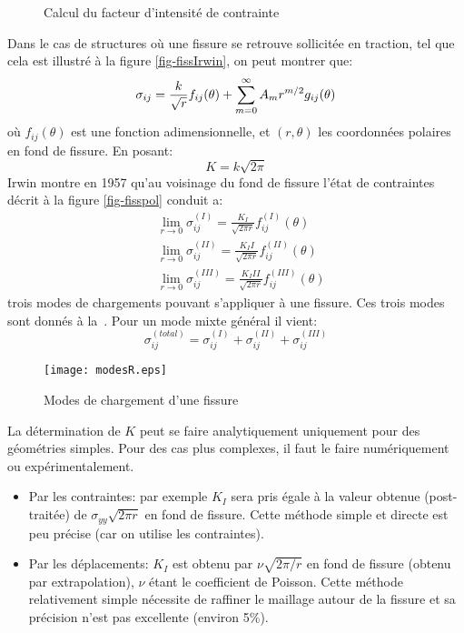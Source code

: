 \begin{figure}[ht]\centering
{}\hspace{6em}
\caption{Calcul du facteur d'intensité de contrainte}
\end{figure}
Dans le cas de structures où une fissure se retrouve sollicitée en traction, tel que cela est illustré à la figure \ref{fig-fissIrwin},
on peut montrer que:
\begin{equation} \sigma_{ij} = \frac{k}{\sqrt{r}} f_{ij}(\theta) + \displaystyle\sum_{m=0}^\infty A_m r^{m/2} g_{ij}(\theta) \end{equation}
où $f_{ij}(\theta)$ est une fonction adimensionnelle, et $(r, \theta)$ les coordonnées polaires en fond
de fissure.
En posant:
\begin{equation} K = k\sqrt{2\pi} \end{equation}
Irwin montre en 1957 qu'au voisinage du fond de
fissure l'état de contraintes décrit à la figure \ref{fig-fisspol} conduit a:
\begin{align}
&\lim_{r\rightarrow0} \sigma_{ij}^{(I)} = \frac{K_I}{\sqrt{2\pi r}} f_{ij}^{(I)}(\theta) \\
&\lim_{r\rightarrow0} \sigma_{ij}^{(II)} = \frac{K_II}{\sqrt{2\pi r}} f_{ij}^{(II)}(\theta) \\
&\lim_{r\rightarrow0} \sigma_{ij}^{(III)} = \frac{K_III}{\sqrt{2\pi r}} f_{ij}^{(III)}(\theta)
\end{align}
trois modes de chargements pouvant s'appliquer à une fissure. Ces trois modes sont donnés à la~.
Pour un mode mixte général il vient:
\begin{equation} \sigma_{ij}^{(total)} = \sigma_{ij}^{(I)} + \sigma_{ij}^{(II)} + \sigma_{ij}^{(III)} \end{equation}
\begin{figure}[htb]
\centering\texttt{[image: modesR.eps]}
\caption{Modes de chargement d'une fissure}\label{fig-modesR}
\end{figure}


\medskip{}
La détermination de $K$ peut se faire analytiquement uniquement pour des géométries simples.
Pour des cas plus complexes, il faut le faire numériquement ou expérimentalement.
\begin{itemize}
\item Par les contraintes: par exemple $K_I$ sera pris égale à la valeur obtenue (post-traitée)
de $\sigma_{yy}\sqrt{2\pi r}$ en fond de fissure. Cette méthode simple et directe est peu
précise (car on utilise les contraintes).
\item Par les déplacements: $K_I$ est obtenu par $\nu \sqrt{2\pi/r}$ en fond de fissure (obtenu
par extrapolation), $\nu$ étant le coefficient de Poisson.
Cette méthode relativement simple nécessite de raffiner le maillage
autour de la fissure et sa précision n'est pas excellente (environ 5\%).
\end{itemize}

